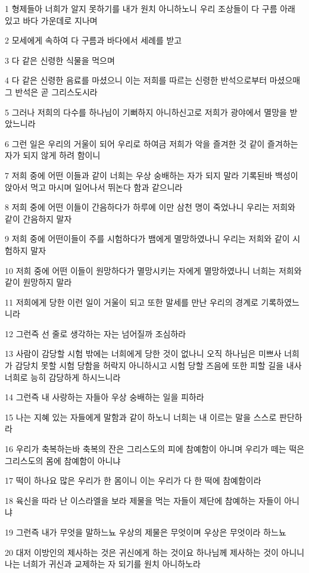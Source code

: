 \par 1 형제들아 너희가 알지 못하기를 내가 원치 아니하노니 우리 조상들이 다 구름 아래 있고 바다 가운데로 지나며
\par 2 모세에게 속하여 다 구름과 바다에서 세례를 받고
\par 3 다 같은 신령한 식물을 먹으며
\par 4 다 같은 신령한 음료를 마셨으니 이는 저희를 따르는 신령한 반석으로부터 마셨으매 그 반석은 곧 그리스도시라
\par 5 그러나 저희의 다수를 하나님이 기뻐하지 아니하신고로 저희가 광야에서 멸망을 받았느니라
\par 6 그런 일은 우리의 거울이 되어 우리로 하여금 저희가 악을 즐겨한 것 같이 즐겨하는 자가 되지 않게 하려 함이니
\par 7 저희 중에 어떤 이들과 같이 너희는 우상 숭배하는 자가 되지 말라 기록된바 백성이 앉아서 먹고 마시며 일어나서 뛰논다 함과 같으니라
\par 8 저희 중에 어떤 이들이 간음하다가 하루에 이만 삼천 명이 죽었나니 우리는 저희와 같이 간음하지 말자
\par 9 저희 중에 어떤이들이 주를 시험하다가 뱀에게 멸망하였나니 우리는 저희와 같이 시험하지 말자
\par 10 저희 중에 어떤 이들이 원망하다가 멸망시키는 자에게 멸망하였나니 너희는 저희와 같이 원망하지 말라
\par 11 저희에게 당한 이런 일이 거울이 되고 또한 말세를 만난 우리의 경계로 기록하였느니라
\par 12 그런즉 선 줄로 생각하는 자는 넘어질까 조심하라
\par 13 사람이 감당할 시험 밖에는 너희에게 당한 것이 없나니 오직 하나님은 미쁘사 너희가 감당치 못할 시험 당함을 허락지 아니하시고 시험 당할 즈음에 또한 피할 길을 내사 너희로 능히 감당하게 하시느니라
\par 14 그런즉 내 사랑하는 자들아 우상 숭배하는 일을 피하라
\par 15 나는 지혜 있는 자들에게 말함과 같이 하노니 너희는 내 이르는 말을 스스로 판단하라
\par 16 우리가 축복하는바 축복의 잔은 그리스도의 피에 참예함이 아니며 우리가 떼는 떡은 그리스도의 몸에 참예함이 아니냐
\par 17 떡이 하나요 많은 우리가 한 몸이니 이는 우리가 다 한 떡에 참예함이라
\par 18 육신을 따라 난 이스라엘을 보라 제물을 먹는 자들이 제단에 참예하는 자들이 아니냐
\par 19 그런즉 내가 무엇을 말하느뇨 우상의 제물은 무엇이며 우상은 무엇이라 하느뇨
\par 20 대저 이방인의 제사하는 것은 귀신에게 하는 것이요 하나님께 제사하는 것이 아니니 나는 너희가 귀신과 교제하는 자 되기를 원치 아니하노라
